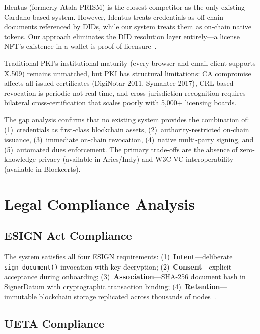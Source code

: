 \documentclass[conference,10pt]{IEEEtran}
\begin{document}
Identus (formerly Atala PRISM) is the closest competitor as the only existing Cardano-based system. However, Identus treats credentials as off-chain documents referenced by DIDs, while our system treats them as on-chain native tokens. Our approach eliminates the DID resolution layer entirely---a license NFT's existence in a wallet is proof of licensure~\cite{identus2024}.

Traditional PKI's institutional maturity (every browser and email client supports X.509) remains unmatched, but PKI has structural limitations: CA compromise affects all issued certificates (DigiNotar 2011, Symantec 2017), CRL-based revocation is periodic not real-time, and cross-jurisdiction recognition requires bilateral cross-certification that scales poorly with 5,000+ licensing boards.

The gap analysis confirms that no existing system provides the combination of: (1)~credentials as first-class blockchain assets, (2)~authority-restricted on-chain issuance, (3)~immediate on-chain revocation, (4)~native multi-party signing, and (5)~automated dues enforcement. The primary trade-offs are the absence of zero-knowledge privacy (available in Aries/Indy) and W3C VC interoperability (available in Blockcerts).

\section{Legal Compliance Analysis}
\label{sec:legal}

\subsection{ESIGN Act Compliance}

The system satisfies all four ESIGN requirements: (1)~\textbf{Intent}---deliberate \texttt{sign\_document()} invocation with key decryption; (2)~\textbf{Consent}---explicit acceptance during onboarding; (3)~\textbf{Association}---SHA-256 document hash in SignerDatum with cryptographic transaction binding; (4)~\textbf{Retention}---immutable blockchain storage replicated across thousands of nodes~\cite{esign,lorraine2007}.

\subsection{UETA Compliance}
\end{document}
